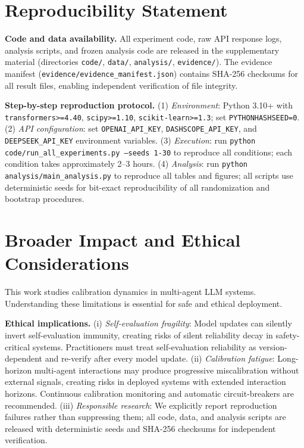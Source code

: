 \documentclass[11pt]{article}
\begin{document}
\section*{Reproducibility Statement}
\label{sec:reproducibility}

\textbf{Code and data availability.} All experiment code, raw API response logs, analysis scripts, and frozen analysis code are released in the supplementary material (directories \texttt{code/}, \texttt{data/}, \texttt{analysis/}, \texttt{evidence/}). The evidence manifest (\texttt{evidence/evidence\_manifest.json}) contains SHA-256 checksums for all result files, enabling independent verification of file integrity.

\textbf{Step-by-step reproduction protocol.} (1) \textit{Environment}: Python 3.10+ with \texttt{transformers>=4.40}, \texttt{scipy>=1.10}, \texttt{scikit-learn>=1.3}; set \texttt{PYTHONHASHSEED=0}. (2) \textit{API configuration}: set \texttt{OPENAI\_API\_KEY}, \texttt{DASHSCOPE\_API\_KEY}, and \texttt{DEEPSEEK\_API\_KEY} environment variables. (3) \textit{Execution}: run \texttt{python code/run\_all\_experiments.py --seeds 1-30} to reproduce all conditions; each condition takes approximately 2--3 hours. (4) \textit{Analysis}: run \texttt{python analysis/main\_analysis.py} to reproduce all tables and figures; all scripts use deterministic seeds for bit-exact reproducibility of all randomization and bootstrap procedures.

\section*{Broader Impact and Ethical Considerations}
\label{sec:ethics}

This work studies calibration dynamics in multi-agent LLM systems. Understanding these limitations is essential for safe and ethical deployment.

\textbf{Ethical implications.} (i) \textit{Self-evaluation fragility}: Model updates can silently invert self-evaluation immunity, creating risks of silent reliability decay in safety-critical systems. Practitioners must treat self-evaluation reliability as version-dependent and re-verify after every model update. (ii) \textit{Calibration fatigue}: Long-horizon multi-agent interactions may produce progressive miscalibration without external signals, creating risks in deployed systems with extended interaction horizons. Continuous calibration monitoring and automatic circuit-breakers are recommended. (iii) \textit{Responsible research}: We explicitly report reproduction failures rather than suppressing them; all code, data, and analysis scripts are released with deterministic seeds and SHA-256 checksums for independent verification.
\end{document}
